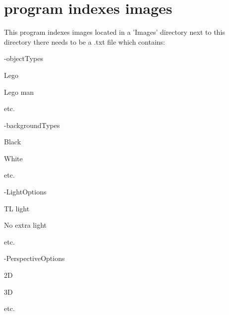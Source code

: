\hypertarget{index_This}{}\section{program indexes images}\label{index_This}
This program indexes images located in a 'Images' directory next to this directory there needs to be a .txt file which contains: \par
 -\/objectTypes \par
 Lego \par
 Lego man \par
 etc. \par
 \par
 -\/backgroundTypes \par
 Black \par
 White \par
 etc. \par
 \par
 -\/LightOptions \par
 TL light \par
 No extra light \par
 etc. \par
 \par
 -\/PerspectiveOptions \par
 2D \par
 3D \par
 etc. 